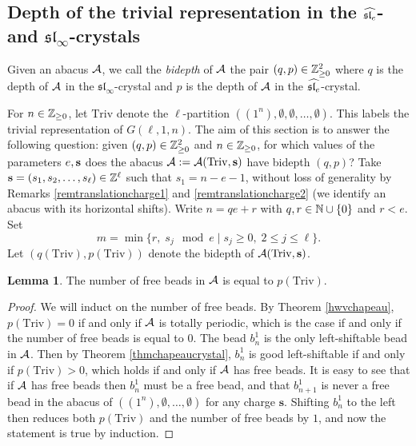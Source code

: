 \documentclass[12pt]{amsart}
\numberwithin{equation}{section}
\theoremstyle{definition}
\newtheorem{lemma}[equation]{Lemma}
\newcommand{\emp}{\emptyset}
\newcommand{\slinf}{\mathfrak{sl}_\infty}
\newcommand{\mbs}{\mathbf{s}}
\newcommand{\triv}{\mathrm{Triv}}
\begin{document}
\subsection{Depth of the trivial representation in the $\widehat{\mathfrak{sl}_e}$- and $\slinf$-crystals }\label{Depth of triv}



Given an abacus $\mathcal{A}$, we call the \textit{bidepth} of $\mathcal{A}$ the pair $(q,p)\in\mathbb{Z}_{\geq0}^2$ where
$q$ is the depth of $\mathcal{A}$ in the $\slinf$-crystal and $p$ is the depth of $\mathcal{A}$ in the $\widehat{\mathfrak{sl}_e}$-crystal.

\medskip

For $n\in\mathbb{Z}_{\geq0}$, let $\triv$ denote the $\ell$-partition $((1^n),\emp,\emp,\dots,\emp)$. 
This labels the trivial representation of $G(\ell,1,n)$.
The aim of this section is to answer the following 
question: given $(q,p)\in\mathbb{Z}_{\geq0}^2$ and $n\in\mathbb{Z}_{\geq0}$, for which values of the parameters $e, \mathbf{s}$ 
does the abacus $\cA:=\cA( \triv, \bs )$ have bidepth $(q,p)$?
Take $\mbs=(s_1,s_2,\dots,s_\ell)\in\Z^\ell$ such that $s_1=n-e-1$, without loss of generality by Remarks \ref{remtranslationcharge1} and \ref{remtranslationcharge2} (we identify an abacus with its horizontal shifts). 
Write $n=qe+r$ with $q,r\in\mathbb{N}\cup\{0\}$ and $r<e$.
Set $$m=\min\{r ,\; s_j \mod e\;|\;s_j\geq 0,\; 2\leq j\leq \ell \}.$$ 
Let $(q(\triv), p(\triv))$ denote the bidepth of $\cA( \triv, \bs )$. 


\begin{lemma}\label{lem6.1}
The number of free beads in $\mathcal{A}$ is equal to $p(\triv)$. 
\end{lemma}
\begin{proof} We will induct on the number of free beads. By Theorem \ref{hwvchapeau}, $p(\triv)=0$ if and only if $\mathcal{A}$ is totally periodic, which is the case if and only if the number of free beads is equal to $0$. The bead $b_n^1$ is the only left-shiftable bead in $\mathcal{A}$. Then by Theorem \ref{thmchapeaucrystal}, $b_n^1$ is good left-shiftable if and only if $p(\triv)>0$, which holds if and only if $\mathcal{A}$ has free beads. It is easy to see that if $\mathcal{A}$ has free beads then $b_n^1$ must be a free bead, and that $b_{n+1}^1$ is never a free bead in the abacus of $((1^n),\emp,\dots,\emp)$ for any charge $\mbs$. Shifting $b_n^1$ to the left then reduces both $p(\triv)$ and the number of free beads by $1$, and now the statement is true by induction.
\end{proof}
\end{document}
